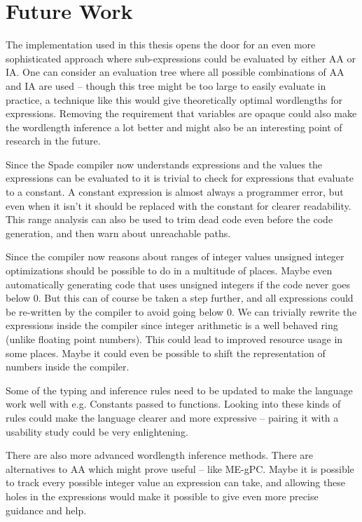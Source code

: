\section{Future Work}
The implementation used in this thesis opens the door for an even more sophisticated approach where sub-expressions could be evaluated by either AA or IA. One can consider an evaluation tree where all possible combinations of AA and IA are used -- though this tree might be too large to easily evaluate in practice, a technique like this would give theoretically optimal wordlengths for expressions. Removing the requirement that variables are opaque could also make the wordlength inference a lot better and might also be an interesting point of research in the future.

Since the Spade compiler now understands expressions and the values the expressions can be evaluated to it is trivial to check for expressions that evaluate to a constant. A constant expression is almost always a programmer error, but even when it isn't it should be replaced with the constant for clearer readability. This range analysis can also be used to trim dead code even before the code generation, and then warn about unreachable paths.

Since the compiler now reasons about ranges of integer values unsigned integer optimizations should be possible to do in a multitude of places. Maybe even automatically generating code that uses unsigned integers if the code never goes below 0. But this can of course be taken a step further, and all expressions could be re-written by the compiler to avoid going below 0. We can trivially rewrite the expressions inside the compiler since integer arithmetic is a well behaved ring (unlike floating point numbers). This could lead to improved resource usage in some places. Maybe it could even be possible to shift the representation of numbers inside the compiler.

Some of the typing and inference rules need to be updated to make the language work well with e.g. Constants passed to functions. Looking into these kinds of rules could make the language clearer and more expressive -- pairing it with a usability study could be very enlightening.

There are also more advanced wordlength inference methods. There are alternatives to AA which might prove useful -- like ME-gPC. Maybe it is possible to track every possible integer value an expression can take, and allowing these holes in the expressions would make it possible to give even more precise guidance and help.

